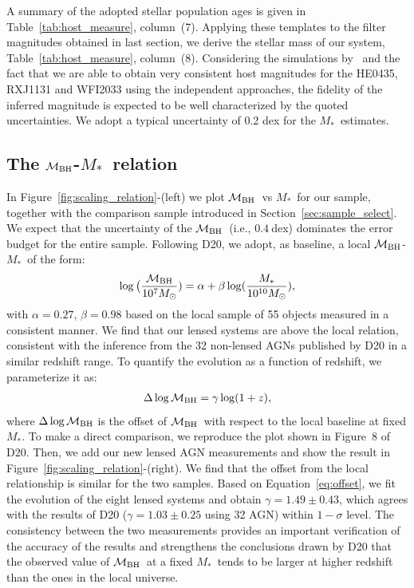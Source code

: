 \documentclass[fleqn,usenatbib]{mnras}
\newcommand{\mbh}{$\mathcal M_{\rm BH}$}
\newcommand{\mstar}{{$M_*$}}
\begin{document}
A summary of the adopted stellar population ages is given in Table~\ref{tab:host_measure}, column~(7). Applying these templates to the filter magnitudes obtained in last section, we derive the stellar mass of our system, Table~\ref{tab:host_measure}, column~(8). Considering the simulations by~\citet{Ding2017a} and the fact that we are able to obtain very consistent host magnitudes for the HE0435, RXJ1131 and WFI2033 using the independent approaches, the fidelity of the inferred magnitude is expected to be well characterized by the quoted uncertainties. We adopt a typical uncertainty of 0.2 dex for the \mstar\ estimates.

\subsection{The \mbh-\mstar\ relation}\label{sec:relation}
In Figure~\ref{fig:scaling_relation}-(left) we plot \mbh\ vs \mstar\ for our sample, together with the comparison sample introduced in Section~\ref{sec:sample_select}.  We expect that the uncertainty of the \mbh\ (i.e., $0.4~$dex) dominates the error budget for the entire sample. Following D20, we adopt, as baseline, a local \mbh-\mstar\ of the form:
\begin{eqnarray}
\label{eq:MMlocal}
\log \big( \frac{\mathcal M_{\rm BH}}{10^{7}M_{\odot}})= \alpha + \beta \log(\frac{M_*}{10^{10}M_{\odot}}),
  \end {eqnarray}
with  $\alpha = 0.27$, $\beta = 0.98$ based on the local sample of 55 objects measured in a consistent manner. We find that our lensed systems are above the local relation, consistent with the inference from the 32  non-lensed AGNs published by D20 in a  similar redshift range. To quantify the evolution as a function of redshift, we parameterize it as:
\begin{eqnarray}
\label{eq:offset}
\Delta \log \mathcal M_{\rm BH}= \gamma \log (1 + z),
\end{eqnarray} 
where $\Delta \log \mathcal M_{\rm BH}$ is the offset of \mbh\ with respect to the local baseline at fixed \mstar. To make a direct comparison, we reproduce the plot shown in Figure~8 of D20. Then, we add our new lensed AGN measurements and show the result in Figure~\ref{fig:scaling_relation}-(right). We find that the offset from the local relationship is similar for the two samples. Based on Equation~\eqref{eq:offset}, we fit the evolution of the eight lensed systems and obtain $\gamma=1.49\pm0.43$, which agrees with the results of D20 ($\gamma=1.03\pm0.25$ using 32 AGN) within $1-\sigma$ level. The consistency between the two measurements provides an important verification of the accuracy of the results and strengthens the conclusions drawn by D20 that the observed value of \mbh\ at a fixed \mstar\ tends to be larger at higher redshift than the ones in the local universe.
\end{document}
